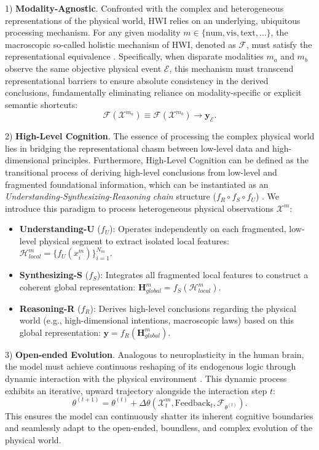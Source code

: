 1) \textbf{Modality-Agnostic}. Confronted with the complex and heterogeneous representations of the physical world, HWI relies on an underlying, ubiquitous processing mechanism. 
For any given modality $m \in \{\text{num}, \text{vis}, \text{text}, \dots\}$, the macroscopic so-called holistic mechanism of HWI, denoted as $\mathcal{F}$, must satisfy the representational equivalence \cite{baltruvsaitis2018multimodal}. 
Specifically, when disparate modalities $m_a$ and $m_b$ observe the same objective physical event $\mathcal{E}$, this mechanism must transcend representational barriers to ensure absolute consistency in the derived conclusions, fundamentally eliminating reliance on modality-specific or explicit semantic shortcuts:
\begin{equation}
\label{eq1}
\mathcal{F}(\mathcal{X}^{m_a}) \equiv \mathcal{F}(\mathcal{X}^{m_b}) \rightarrow \mathbf{y}_{\mathcal{E}}.
\end{equation}

2) \textbf{High-Level Cognition}. The essence of processing the complex physical world lies in bridging the representational chasm between low-level data and high-dimensional principles. Furthermore, High-Level Cognition can be defined as the transitional process of deriving high-level conclusions from low-level and fragmented foundational information, which can be instantiated as an \emph{Understanding-Synthesizing-Reasoning chain} structure ($f_R \circ f_S \circ f_U$) \cite{liu2025can}. We introduce this paradigm to process heterogeneous physical observations $\mathcal{X}^{m}$: 
\begin{itemize}[leftmargin=*]
    \item \textbf{Understanding-U} ($f_U$): Operates independently on each fragmented, low-level physical segment to extract isolated local features: $\mathcal{H}_{local}^{m} = \{ f_{U}(x_{i}^{m}) \}_{i=1}^{N_{m}}$. 
    \item \textbf{Synthesizing-S} ($f_S$): Integrates all fragmented local features to construct a coherent global representation: $\mathbf{H}_{global}^{m} = f_{S}(\mathcal{H}_{local}^{m})$.
    \item \textbf{Reasoning-R} ($f_R$): Derives high-level conclusions regarding the physical world (e.g., high-dimensional intentions, macroscopic laws) based on this global representation: $\mathbf{y} = f_{R}(\mathbf{H}_{global}^{m})$.
\end{itemize}

3) \textbf{Open-ended Evolution}. Analogous to neuroplasticity in the human brain, the model must achieve continuous reshaping of its endogenous logic through dynamic interaction with the physical environment \cite{parisi2019continual}. This dynamic process exhibits an iterative, upward trajectory alongside the interaction step $t$:
\begin{equation}
\label{eq2}
\theta^{(t+1)} = \theta^{(t)} + \Delta \theta \left( \mathcal{X}_{t}^{m}, \text{Feedback}_{t}, \mathcal{F}_{\theta^{(t)}} \right).
\end{equation}
This ensures the model can continuously shatter its inherent cognitive boundaries and seamlessly adapt to the open-ended, boundless, and complex evolution of the physical world.

